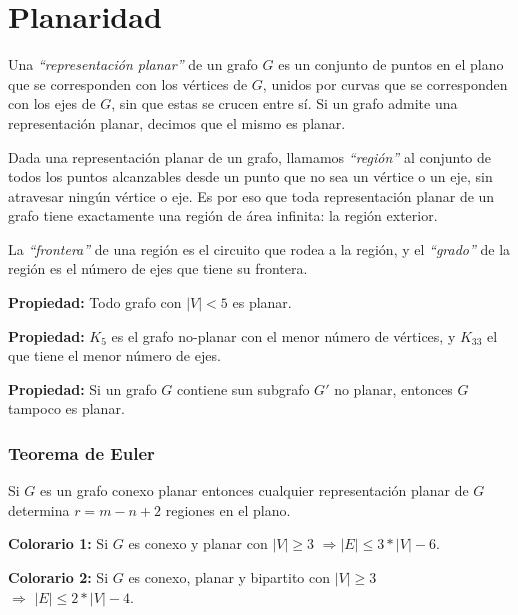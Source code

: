 \newpage
\section{Planaridad}

Una \emph{``representaci\'on planar''} de un grafo $G$ es un conjunto de puntos en el plano que se corresponden con los v\'ertices de $G$, unidos por curvas que se corresponden con los ejes de $G$, sin que estas se crucen entre s\'i. Si un grafo admite una representaci\'on planar, decimos que el mismo es planar.

Dada una representaci\'on planar de un grafo, llamamos \emph{``regi\'on''} al conjunto de todos los puntos alcanzables desde un punto que no sea un v\'ertice o un eje, sin atravesar ning\'un v\'ertice o eje. Es por eso que toda representaci\'on planar de un grafo tiene exactamente una regi\'on de \'area infinita: la regi\'on exterior.

La \emph{``frontera''} de una regi\'on es el circuito que rodea a la regi\'on, y el \emph{``grado''} de la regi\'on es el n\'umero de ejes que tiene su frontera.

\begin{badidea}
\textbf{Propiedad:} Todo grafo con $|V| < 5$ es planar.
\end{badidea}

\begin{badidea}
\textbf{Propiedad:} $K_5$ es el grafo no-planar con el menor n\'umero de v\'ertices, y $K_{33}$ el que tiene el menor n\'umero de ejes.
\end{badidea}

\begin{badidea}
\textbf{Propiedad:} Si un grafo $G$ contiene sun subgrafo $G'$ no planar, entonces $G$ tampoco es planar.
\end{badidea}

\subsubsection{Teorema de Euler}

Si $G$ es un grafo conexo planar entonces cualquier representaci\'on planar de $G$ determina $r = m - n + 2$ regiones en el plano.

\begin{badidea}
\textbf{Colorario 1:} Si $G$ es conexo y planar con $|V| \geq 3$ $\Rightarrow |E| \leq 3 * |V| - 6$.
\end{badidea}

\begin{badidea}
\textbf{Colorario 2:} Si $G$ es conexo, planar y bipartito con $|V| \geq 3$ \\ $\Rightarrow$ $|E| \leq 2 * |V| - 4$.
\end{badidea}

